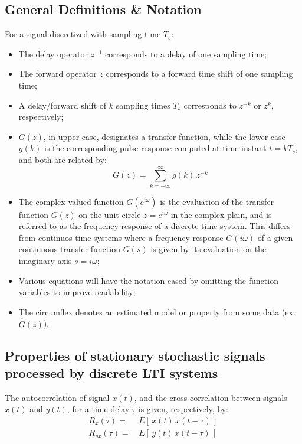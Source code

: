 \documentclass[  10pt, twoside]{report} %
\numberwithin{equation}{chapter}
\begin{document}
\subsection{General Definitions \& Notation}
For a signal discretized with sampling time $T_s$:
\begin{itemize}
    \item The delay operator $z^{-1}$ corresponds to a delay of one sampling time;
    \item The forward operator $z$ corresponds to a forward time shift of one sampling time;
    \item A delay/forward shift of $k$ sampling times $T_s$ corresponds to $z^{-k}$ or $z^k$, respectively;
    \item $G(z)$, in upper case, designates a transfer function, while the lower case $g(k)$ is the corresponding pulse response computed at time instant $t = k T_s$, and both are related by:
        \begin{equation}
            G(z) = \sum_{k=-\infty}^{\infty} g(k)\, z^{-k}
        \end{equation}
    \item The complex-valued function $G(e^{i\omega})$ is the evaluation of the transfer function $G(z)$ on the unit circle $z=e^{i\omega}$ in the complex plain, and is referred to as the frequency response of a discrete time system. This differs from continuos time systems where a frequency response $G(i\omega)$ of a given continuous transfer function $G(s)$ is given by its evaluation on the imaginary axis $s = i\omega$;
    \item Various equations will have the notation eased by omitting the function variables to improve readability;
    \item The circumflex denotes an estimated model or property from some data (ex. $\widehat{G}(z)$).
\end{itemize}


\subsection{Properties of stationary stochastic signals processed by discrete LTI systems}

The autocorrelation of signal $x(t)$, and the cross correlation between signals $x(t)$ and $y(t)$, for a time delay $\tau$ is given, respectively, by:
\begin{align}
    R_{x}(\tau)  =& \, E\left[ \, x(t)\, x(t-\tau) \, \right] \\[2mm]
    R_{yx}(\tau) =& \, E\left[ \, y(t)\, x(t-\tau) \, \right] 
\end{align} 
\end{document}
